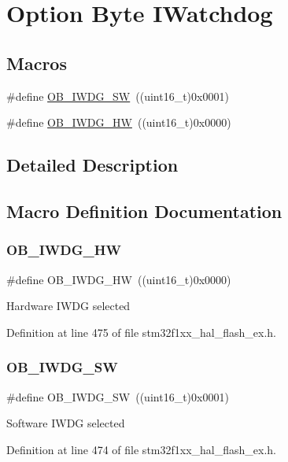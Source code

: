 \hypertarget{group___f_l_a_s_h_ex___o_b___i_watchdog}{}\section{Option Byte I\+Watchdog}
\label{group___f_l_a_s_h_ex___o_b___i_watchdog}
\subsection*{Macros}
\begin{DoxyCompactItemize}
\item 
\#define \hyperlink{group___f_l_a_s_h_ex___o_b___i_watchdog_ga5a357e232c955444c3f2ccb9a937ffce}{O\+B\+\_\+\+I\+W\+D\+G\+\_\+\+SW}~((uint16\+\_\+t)0x0001)
\item 
\#define \hyperlink{group___f_l_a_s_h_ex___o_b___i_watchdog_gadfcbfa963d79c339ec8e2d5a7734e47a}{O\+B\+\_\+\+I\+W\+D\+G\+\_\+\+HW}~((uint16\+\_\+t)0x0000)
\end{DoxyCompactItemize}


\subsection{Detailed Description}


\subsection{Macro Definition Documentation}
\mbox{\label{group___f_l_a_s_h_ex___o_b___i_watchdog_gadfcbfa963d79c339ec8e2d5a7734e47a}} 
\subsubsection{\texorpdfstring{O\+B\+\_\+\+I\+W\+D\+G\+\_\+\+HW}{OB\_IWDG\_HW}}
{\footnotesize\ttfamily \#define O\+B\+\_\+\+I\+W\+D\+G\+\_\+\+HW~((uint16\+\_\+t)0x0000)}

Hardware I\+W\+DG selected 

Definition at line 475 of file stm32f1xx\+\_\+hal\+\_\+flash\+\_\+ex.\+h.

\mbox{\label{group___f_l_a_s_h_ex___o_b___i_watchdog_ga5a357e232c955444c3f2ccb9a937ffce}} 
\subsubsection{\texorpdfstring{O\+B\+\_\+\+I\+W\+D\+G\+\_\+\+SW}{OB\_IWDG\_SW}}
{\footnotesize\ttfamily \#define O\+B\+\_\+\+I\+W\+D\+G\+\_\+\+SW~((uint16\+\_\+t)0x0001)}

Software I\+W\+DG selected 

Definition at line 474 of file stm32f1xx\+\_\+hal\+\_\+flash\+\_\+ex.\+h.

